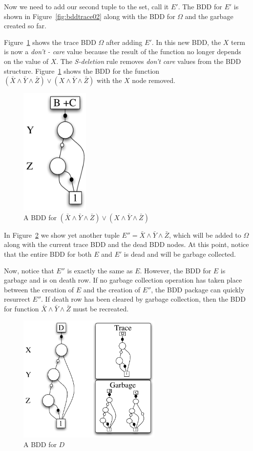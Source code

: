 \documentclass[defaultstyle,11pt]{thesis}
\begin{document}
Now we need to add our second tuple to the set, call it $E'$.  The BDD
for $E'$ is shown in Figure~\ref{fig:bddtrace02} along with the BDD
for $\Omega$ and the garbage created so far. 

Figure~\ref{fig:bddtrace03} shows the trace BDD $\Omega$ after adding
$E'$.  In this new BDD, the $X$ term is now a \textit{don't - care}
value because the result of the function no longer depends on the
value of $X$.  The \textit{S-deletion} rule removes \textit{don't
  care} values from the BDD structure.  Figure~\ref{fig:bddtrace03}
shows the BDD for the function
$(\bar{X}\land\bar{Y}\land\bar{Z})\lor(X\land\bar{Y}\land\bar{Z})$
with the $X$ node removed.

\begin{figure}
  \centering
  \includegraphics[height=2.5in]{figures/bddtrace03}
  \caption{A BDD for $(\bar{X}\land\bar{Y}\land\bar{Z})\lor(X\land\bar{Y}\land\bar{Z})$}
  \label{fig:bddtrace03}
\end{figure}

In Figure~\ref{fig:bddtrace04} we show yet another tuple $E'' =
\bar{X}\land\bar{Y}\land\bar{Z}$, which will be added to $\Omega$
along with the current trace BDD and the dead BDD nodes.  At this
point, notice that the entire BDD for both $E$ and $E'$ is dead and
will be garbage collected.

Now, notice that $E''$ is exactly the same as $E$.  However, the BDD
for $E$ is garbage and is on death row.  If no garbage collection
operation has taken place between the creation of $E$ and the creation
of $E''$, the BDD package can quickly resurrect $E''$.  If death row
has been cleared by garbage collection, then the BDD for function
$\bar{X}\land\bar{Y}\land\bar{Z}$ must be recreated.
\begin{figure}
  \centering
  \includegraphics[height=2.5in]{figures/bddtrace04}
  \caption{A BDD for $D$}
  \label{fig:bddtrace04}
\end{figure}
\end{document}
